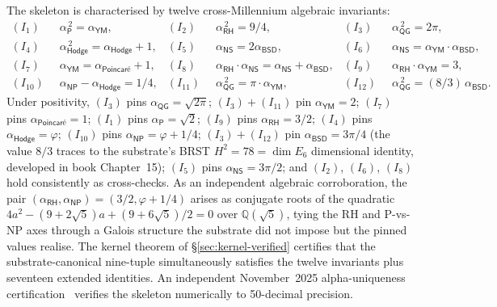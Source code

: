 \documentclass[11pt,a4paper]{amsart}
\theoremstyle{plain}
\theoremstyle{definition}
\begin{document}
The skeleton is characterised by twelve cross-Millennium algebraic invariants:
\begin{align*}
(I_1)\;\; & \alpha_{\textsf{P}}^{\,2} = \alpha_{\textsf{YM}}, &
(I_2)\;\; & \alpha_{\textsf{RH}}^{\,2} = 9/4, &
(I_3)\;\; & \alpha_{\textsf{QG}}^{\,2} = 2\pi, \\
(I_4)\;\; & \alpha_{\textsf{Hodge}}^{\,2} = \alpha_{\textsf{Hodge}} + 1, &
(I_5)\;\; & \alpha_{\textsf{NS}} = 2\alpha_{\textsf{BSD}}, &
(I_6)\;\; & \alpha_{\textsf{NS}} = \alpha_{\textsf{YM}} \cdot \alpha_{\textsf{BSD}}, \\
(I_7)\;\; & \alpha_{\textsf{YM}} = \alpha_{\textsf{Poincar\'e}} + 1, &
(I_8)\;\; & \alpha_{\textsf{RH}} \cdot \alpha_{\textsf{NS}} = \alpha_{\textsf{NS}} + \alpha_{\textsf{BSD}}, &
(I_9)\;\; & \alpha_{\textsf{RH}} \cdot \alpha_{\textsf{YM}} = 3, \\
(I_{10})\;\; & \alpha_{\textsf{NP}} - \alpha_{\textsf{Hodge}} = 1/4, &
(I_{11})\;\; & \alpha_{\textsf{QG}}^{\,2} = \pi \cdot \alpha_{\textsf{YM}}, &
(I_{12})\;\; & \alpha_{\textsf{QG}}^{\,2} = (8/3)\,\alpha_{\textsf{BSD}}.
\end{align*}
Under positivity, $(I_3)$ pins $\alpha_{\textsf{QG}} = \sqrt{2\pi}$; $(I_3) + (I_{11})$ pin $\alpha_{\textsf{YM}} = 2$; $(I_7)$ pins $\alpha_{\textsf{Poincar\'e}} = 1$; $(I_1)$ pins $\alpha_{\textsf{P}} = \sqrt{2}$; $(I_9)$ pins $\alpha_{\textsf{RH}} = 3/2$; $(I_4)$ pins $\alpha_{\textsf{Hodge}} = \varphi$; $(I_{10})$ pins $\alpha_{\textsf{NP}} = \varphi + 1/4$; $(I_3) + (I_{12})$ pin $\alpha_{\textsf{BSD}} = 3\pi/4$ (the value $8/3$ traces to the substrate's BRST $H^2 = 78 = \dim E_6$ dimensional identity, developed in book Chapter~15); $(I_5)$ pins $\alpha_{\textsf{NS}} = 3\pi/2$; and $(I_2)$, $(I_6)$, $(I_8)$ hold consistently as cross-checks. As an independent algebraic corroboration, the pair $(\alpha_{\textsf{RH}}, \alpha_{\textsf{NP}}) = (3/2, \varphi + 1/4)$ arises as conjugate roots of the quadratic $4a^2 - (9 + 2\sqrt{5})a + (9 + 6\sqrt{5})/2 = 0$ over $\mathbb{Q}(\sqrt{5})$, tying the RH and P-vs-NP axes through a Galois structure the substrate did not impose but the pinned values realise. The kernel theorem of \S\ref{sec:kernel-verified} certifies that the substrate-canonical nine-tuple simultaneously satisfies the twelve invariants plus seventeen extended identities. An independent November~2025 alpha-uniqueness certification~\cite{cohen2025alphaUniqueness} verifies the skeleton numerically to 50-decimal precision.
\end{document}
